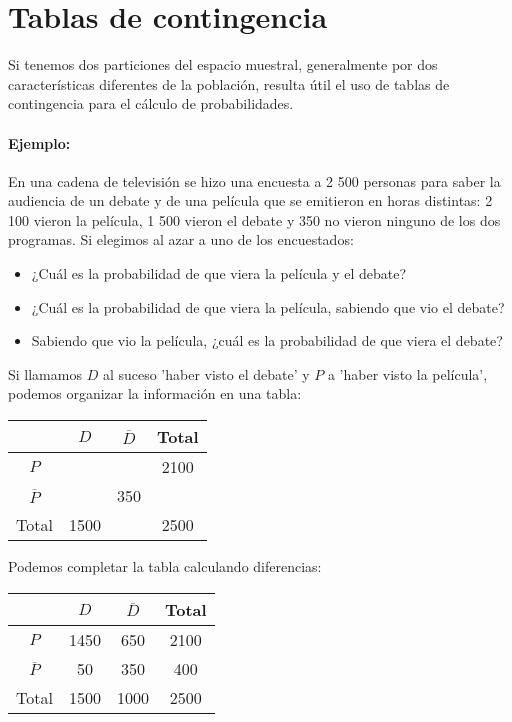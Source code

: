\section{Tablas de contingencia}

Si tenemos dos particiones del espacio muestral, generalmente por dos características diferentes de la población, resulta útil el uso de tablas de contingencia para el cálculo de probabilidades.

\paragraph{Ejemplo:} En una cadena de televisión se hizo una encuesta a 2 500 personas para saber la audiencia de un debate y de una película que se emitieron en horas distintas: 2 100 vieron la película, 1 500 vieron el debate y 350 no
vieron ninguno de los dos programas. Si elegimos al azar a uno de los encuestados:
\begin{itemize}
    \item ¿Cuál es la probabilidad de que viera la película y el debate?
    \item ¿Cuál es la probabilidad de que viera la película, sabiendo que vio el debate?
    \item Sabiendo que vio la película, ¿cuál es la probabilidad de que viera el debate?
\end{itemize}

Si llamamos $D$ al suceso 'haber visto el debate'  y $P$ a 'haber visto la película', podemos organizar la información en una tabla:

\begin{center}
 \begin{tabular}{|c | c | c | c |} 
 \hline
  &  $D$ & $\overline{D}$ & Total \\ [0.5ex] 
 \hline
 $P$ &  &  & 2100 \\ 
 \hline
 $\overline{P}$ &  & 350 &  \\
 \hline
 Total & 1500 &  &  2500 \\
 \hline
\end{tabular}
\end{center}

Podemos completar la tabla calculando diferencias:

\begin{center}
 \begin{tabular}{|c | c | c | c |} 
 \hline
  &  $D$ & $\overline{D}$ & Total \\ [0.5ex] 
 \hline
 $P$ & \color{red}1450 & \color{red}650 & 2100 \\ 
 \hline
 $\overline{P}$ & \color{red}50  & 350 & \color{red}400 \\
 \hline
 Total & 1500 & \color{red}1000 &  2500 \\
 \hline
\end{tabular}
\end{center}

